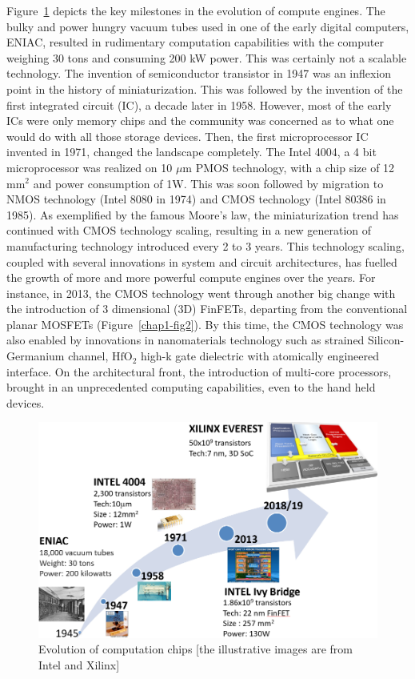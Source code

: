 \begin{multicols}{2}
Figure~\ref{chap1-fig1} depicts  the key milestones in the evolution of compute engines. The bulky and power hungry vacuum tubes used in one of the early digital computers, ENIAC, resulted in rudimentary computation capabilities with the computer weighing 30 tons and consuming 200 kW power. This was certainly not a scalable technology. The invention of semiconductor transistor in 1947 was an inflexion point in the history of miniaturization. This was followed by the invention of the first integrated circuit (IC), a decade later in 1958. However, most of the early ICs were only memory chips and the community was concerned as to what one would do with all those storage devices. Then, the first microprocessor IC invented in 1971,  changed the landscape completely. The Intel 4004, a 4 bit microprocessor was realized on 10 $\mu\mbox{m}$ PMOS technology, with a chip size of 12 $\text{mm}^2$ and power consumption of 1W. This was soon followed by migration to  NMOS technology (Intel 8080 in 1974) and CMOS technology (Intel 80386 in 1985).  As exemplified by the famous Moore’s law, the miniaturization trend has continued with CMOS technology scaling, resulting in a new generation of manufacturing technology introduced every 2 to 3 years. This technology scaling,  coupled with several innovations in system and circuit architectures, has fuelled the growth of more and more powerful compute engines over the years. For instance, in 2013, the CMOS technology went through another big change with the introduction of 3 dimensional (3D) FinFETs, departing from the conventional planar MOSFETs (Figure~\ref{chap1-fig2}). By this time, the CMOS technology was also enabled by innovations in nanomaterials technology such as strained Silicon-Germanium channel, $\mbox{HfO}_2$ high-k gate dielectric with atomically engineered interface. On the architectural front, the introduction of multi-core processors, brought in an unprecedented computing capabilities, even to the hand held devices.  
\begin{figure}[H]
\centering
\includegraphics[scale=1.1]{src/Figures/chap1/chap1-fig01.jpg}
\caption{Evolution of computation chips [the illustrative images are from Intel and Xilinx]}\label{chap1-fig1}
\end{figure}


\end{multicols}
